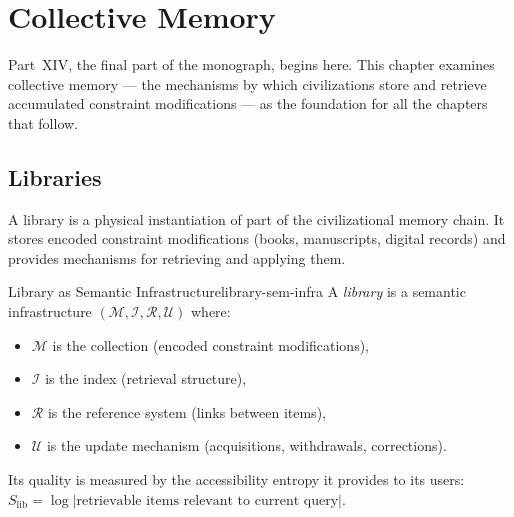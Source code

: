 \chapter{Collective Memory}



Part~XIV, the final part of the monograph, begins here. This chapter
examines collective memory — the mechanisms by which civilizations
store and retrieve accumulated constraint modifications — as the
foundation for all the chapters that follow.

\section{Libraries}

A library is a physical instantiation of part of the civilizational
memory chain. It stores encoded constraint modifications (books,
manuscripts, digital records) and provides mechanisms for retrieving
and applying them.

\begin{definition}{Library as Semantic Infrastructure}{library-sem-infra}
  A \emph{library} is a semantic infrastructure $(\mathcal{M},
  \mathcal{I}, \mathcal{R}, \mathcal{U})$ where:
  \begin{itemize}
    \item $\mathcal{M}$ is the collection (encoded constraint modifications),
    \item $\mathcal{I}$ is the index (retrieval structure),
    \item $\mathcal{R}$ is the reference system (links between items),
    \item $\mathcal{U}$ is the update mechanism (acquisitions, withdrawals,
          corrections).
  \end{itemize}
  Its quality is measured by the accessibility entropy it provides
  to its users: $S_\text{lib} = \log|\text{retrievable items relevant
  to current query}|$.
\end{definition}

